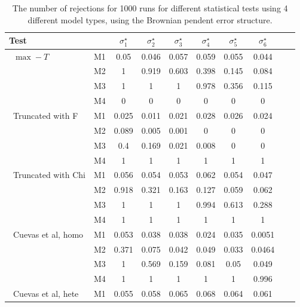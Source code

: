 \documentclass[12pt]{article}
\begin{document}
{\footnotesize
    \begin{table}[H]
     \caption{\label{demo-table}The number of rejections for 1000 runs for different statistical
     tests using 4 different model types, using the Brownian pendent error structure.}
        \centering
        \begin{tabular}{l l c c c c c c c c}
            \hline
            Test                 &    & $\sigma_1^\star$ & $\sigma_2^\star$ & $\sigma_3^\star$
                                         & $\sigma_4^\star$ & $\sigma_5^\star$ & $\sigma_6^\star$ \\[0.5ex]
            \hline
            \ $\max-T$              & M1 & 0.05&	0.046&	0.057&	0.059&	0.055&	0.044  \\
                                 & M2 & 1	&0.919&	0.603&	0.398&	0.145&	0.084  \\
                                 & M3 &   1  & 1 & 1 & 0.978 & 0.356 & 0.115 & \\
                                 & M4 & 0  & 0 & 0 & 0 & 0 & 0 &  \\ \hline
                      \ Truncated with F   & M1 & 0.025	&0.011&	0.021&	0.028&	0.026&	0.024  \\
                                 & M2 & 0.089	&0.005	&0.001&	0	&0&	0   \\
                                 & M3 & 0.4	&0.169	&0.021&	0.008&	0&	0    \\
                                 & M4 & 1  & 1   & 1   & 1   & 1   & 1   \\\hline
                         \ Truncated with Chi   & M1 & 0.056	&0.054&	0.053&	0.062&	0.054&	0.047  \\
             & M2 & 0.918	&0.321&	0.163&	0.127&	0.059&	0.062     \\
             & M3 & 1	& 1&	1&	0.994&	0.613&	0.288    \\
             & M4 & 1  & 1   & 1   & 1   & 1   & 1   \\\hline
                      \ Cuevas et al, homo & M1 & 0.053&	0.038&	0.038&	0.024&	0.035&	0.0051 \\
                                 & M2 & 0.371&	0.075&	0.042&	0.049&	0.033&	0.0464  \\
                                 & M3 & 1&	0.569&	0.159&	0.081&	0.05&	0.049 \\
                                 & M4 & 1&	1&	1&	1&	1&	0.996  \\\hline
                       \ Cuevas et al, hete & M1 & 0.055&	0.058&	0.065&	0.068&	0.064&	0.061  \\

\end{tabular}
\end{table}}
\end{document}

